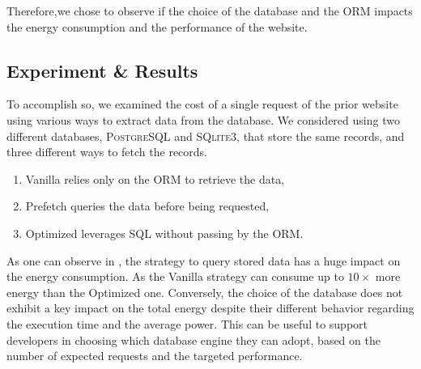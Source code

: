 Therefore,we chose to observe if the choice of the database and the ORM impacts the energy consumption and the performance of the website.
\subsection{Experiment \& Results}
To accomplish so, we examined the cost of a single request of the prior website using various ways to extract data from the database.
We considered using two different databases, \textsc{PostgreSQL} and \textsc{SQlite3}, that store the same records, and three different ways to fetch the records.
\begin{enumerate}
    \item \textsf{Vanilla} relies only on the ORM to retrieve the data,
    \item \textsf{Prefetch} queries the data before being requested,
    \item \textsf{Optimized} leverages SQL without passing by the ORM.
\end{enumerate}


As one can observe in , the strategy to query stored data has a huge impact on the energy consumption.
As the \textsf{Vanilla} strategy can consume up to $10\times$ more energy than the \textsf{Optimized} one.
Conversely, the choice of the database does not exhibit a key impact on the total energy despite their different behavior regarding the execution time and the average power.
This can be useful to support developers in choosing which database engine they can adopt, based on the number of expected requests and the targeted performance.


